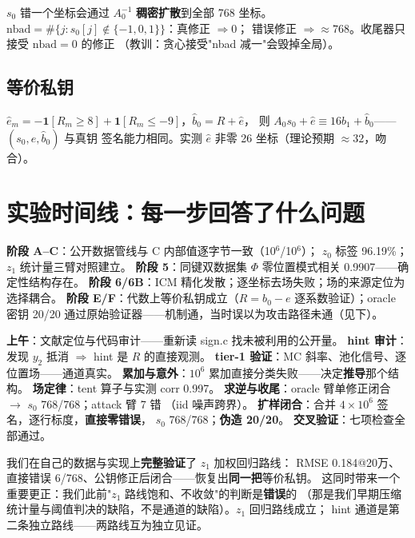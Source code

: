\documentclass[11pt,a4paper]{ctexart}
\begin{document}
$s_0$ 错一个坐标会通过 $A_0^{-1}$ \textbf{稠密扩散}到全部 768 坐标。
$\mathrm{nbad} = \#\{j: s_0[j]\notin\{-1,0,1\}\}$：真修正 $\Rightarrow 0$；
错误修正 $\Rightarrow \approx768$。收尾器只接受 $\mathrm{nbad}=0$ 的修正
（教训：贪心接受"nbad 减一"会毁掉全局）。

\subsection{等价私钥}

$\hat e_m = -\mathbf{1}[R_m\ge8] + \mathbf{1}[R_m\le-9]$，$\hat b_0 = R+\hat e$，
则 $A_0 s_0 + \hat e \equiv 16b_1 + \hat b_0$——$(s_0,\hat e,\hat b_0)$ 与真钥
签名能力相同。实测 $\hat e$ 非零 26 坐标（理论预期 $\approx32$，吻合）。

\section{实验时间线：每一步回答了什么问题}

\begin{story}
\textbf{阶段 A--C}：公开数据管线与 C 内部值逐字节一致（10$^6$/10$^6$）；
$z_0$ 标签 96.19\%；$z_1$ 统计量三臂对照建立。
\textbf{阶段 5}：同键双数据集 $\Phi$ 零位置模式相关 0.9907——确定性结构存在。
\textbf{阶段 6/6B}：ICM 精化发散；逐坐标去场失败；场的来源定位为选择耦合。
\textbf{阶段 E/F}：代数上等价私钥成立（$R=b_0-e$ 逐系数验证）；oracle 密钥
20/20 通过原始验证器——机制通，当时误以为攻击路径未通（见下）。
\end{story}

\begin{story}
\textbf{上午}：文献定位与代码审计——重新读 sign.c 找未被利用的公开量。
\textbf{hint 审计}：发现 $y_2$ 抵消 $\Rightarrow$ hint 是 $R$ 的直接观测。
\textbf{tier-1 验证}：MC 斜率、池化信号、逐位置场——通道真实。
\textbf{累加与意外}：$10^6$ 累加直接分类失败——决定\textbf{推导}那个结构。
\textbf{场定律}：tent 算子与实测 corr 0.997。
\textbf{求逆与收尾}：oracle 臂单修正闭合 $\to$ $s_0$ 768/768；attack 臂 7 错
（iid 噪声跨界）。
\textbf{扩样闭合}：合并 $4\times10^6$ 签名，逐行标度，\textbf{直接零错误}，
$s_0$ 768/768；\textbf{伪造 20/20}。
\textbf{交叉验证}：七项检查全部通过。
\end{story}

\begin{story}
我们在自己的数据与实现上\textbf{完整验证}了 $z_1$ 加权回归路线：
RMSE 0.184@20万、直接错误 6/768、公钥修正后闭合——恢复出\textbf{同一把}等价私钥。
这同时带来一个重要更正：我们此前"$z_1$ 路线饱和、不收敛"的判断是\textbf{错误}的
（那是我们早期压缩统计量与阈值判决的缺陷，不是通道的缺陷）。$z_1$ 回归路线成立；
hint 通道是第二条独立路线——两路线互为独立见证。
\end{story}
\end{document}
